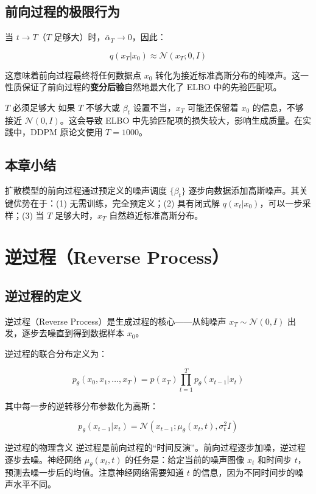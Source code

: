 \documentclass[a4paper]{article}
\begin{document}
\subsection{前向过程的极限行为}

当 $t \to T$（$T$ 足够大）时，$\bar{\alpha}_T \to 0$，因此：

$$q(x_T | x_0) \approx \mathcal{N}(x_T; 0, I)$$

这意味着前向过程最终将任何数据点 $x_0$ 转化为接近标准高斯分布的纯噪声。这一性质保证了前向过程的\textbf{变分后验}自然地最大化了 ELBO 中的先验匹配项。

\begin{warningbox}{$T$ 必须足够大}
如果 $T$ 不够大或 $\beta_t$ 设置不当，$x_T$ 可能还保留着 $x_0$ 的信息，不够接近 $\mathcal{N}(0, I)$。这会导致 ELBO 中先验匹配项的损失较大，影响生成质量。在实践中，DDPM 原论文使用 $T = 1000$。
\end{warningbox}

\subsection{本章小结}

扩散模型的前向过程通过预定义的噪声调度 $\{\beta_t\}$ 逐步向数据添加高斯噪声。其关键优势在于：(1) 无需训练，完全预定义；(2) 具有闭式解 $q(x_t|x_0)$，可以一步采样；(3) 当 $T$ 足够大时，$x_T$ 自然趋近标准高斯分布。


\section{逆过程（Reverse Process）}

\subsection{逆过程的定义}

逆过程（Reverse Process）是生成过程的核心——从纯噪声 $x_T \sim \mathcal{N}(0, I)$ 出发，逐步去噪直到得到数据样本 $x_0$。

逆过程的联合分布定义为：

$$p_\theta(x_0, x_1, \ldots, x_T) = p(x_T) \prod_{t=1}^{T} p_\theta(x_{t-1} | x_t)$$

其中每一步的逆转移分布参数化为高斯：

$$p_\theta(x_{t-1} | x_t) = \mathcal{N}(x_{t-1}; \mu_\theta(x_t, t), \sigma_t^2 I)$$

\begin{importantbox}{逆过程的物理含义}
逆过程是前向过程的``时间反演''。前向过程逐步加噪，逆过程逐步去噪。神经网络 $\mu_\theta(x_t, t)$ 的任务是：给定当前的噪声图像 $x_t$ 和时间步 $t$，预测去噪一步后的均值。注意神经网络需要知道 $t$ 的信息，因为不同时间步的噪声水平不同。
\end{importantbox}
\end{document}
